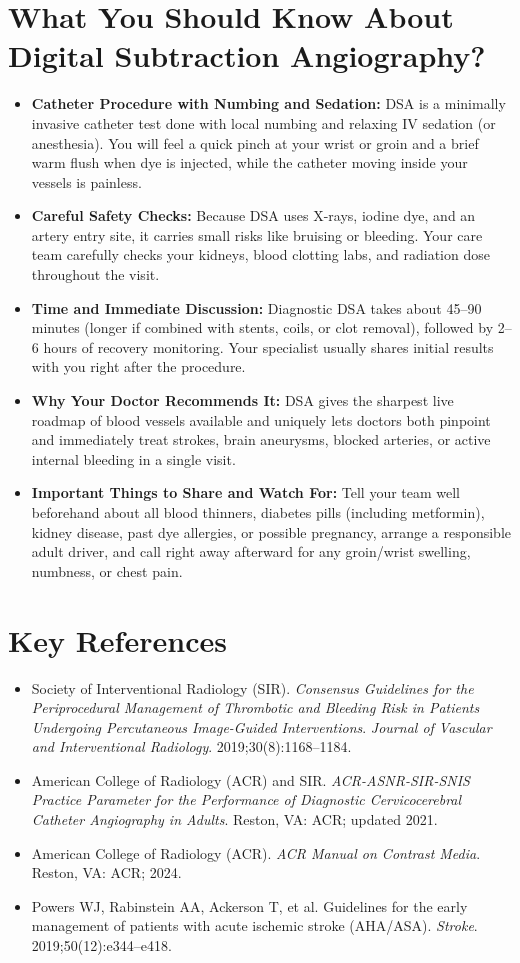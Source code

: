 \section{What You Should Know About Digital Subtraction Angiography?}
\begin{itemize}
\item \textbf{Catheter Procedure with Numbing and Sedation:} DSA is a minimally invasive catheter test done with local numbing and relaxing IV sedation (or anesthesia). You will feel a quick pinch at your wrist or groin and a brief warm flush when dye is injected, while the catheter moving inside your vessels is painless.
\item \textbf{Careful Safety Checks:} Because DSA uses X-rays, iodine dye, and an artery entry site, it carries small risks like bruising or bleeding. Your care team carefully checks your kidneys, blood clotting labs, and radiation dose throughout the visit.
\item \textbf{Time and Immediate Discussion:} Diagnostic DSA takes about 45--90 minutes (longer if combined with stents, coils, or clot removal), followed by 2--6 hours of recovery monitoring. Your specialist usually shares initial results with you right after the procedure.
\item \textbf{Why Your Doctor Recommends It:} DSA gives the sharpest live roadmap of blood vessels available and uniquely lets doctors both pinpoint and immediately treat strokes, brain aneurysms, blocked arteries, or active internal bleeding in a single visit.
\item \textbf{Important Things to Share and Watch For:} Tell your team well beforehand about all blood thinners, diabetes pills (including metformin), kidney disease, past dye allergies, or possible pregnancy, arrange a responsible adult driver, and call right away afterward for any groin/wrist swelling, numbness, or chest pain.
\end{itemize}

\section{Key References}
\begin{itemize}
\item Society of Interventional Radiology (SIR). \textit{Consensus Guidelines for the Periprocedural Management of Thrombotic and Bleeding Risk in Patients Undergoing Percutaneous Image-Guided Interventions}. \textit{Journal of Vascular and Interventional Radiology}. 2019;30(8):1168--1184.
\item American College of Radiology (ACR) and SIR. \textit{ACR-ASNR-SIR-SNIS Practice Parameter for the Performance of Diagnostic Cervicocerebral Catheter Angiography in Adults}. Reston, VA: ACR; updated 2021.
\item American College of Radiology (ACR). \textit{ACR Manual on Contrast Media}. Reston, VA: ACR; 2024.
\item Powers WJ, Rabinstein AA, Ackerson T, et al. Guidelines for the early management of patients with acute ischemic stroke (AHA/ASA). \textit{Stroke}. 2019;50(12):e344--e418.
\end{itemize}
